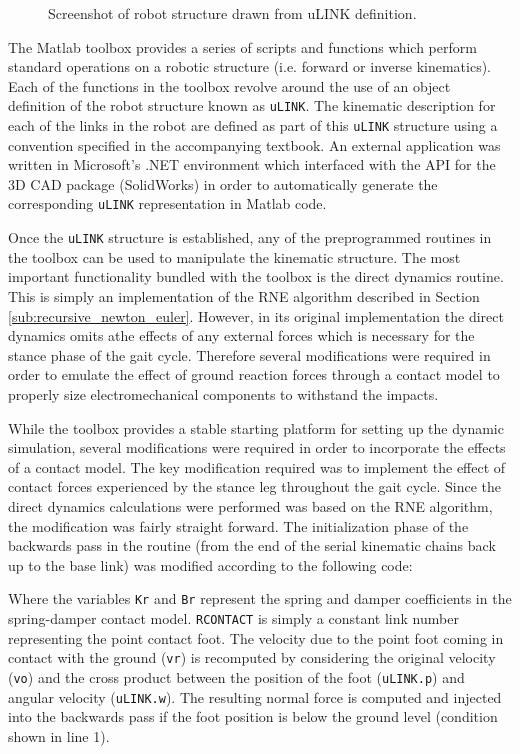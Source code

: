 \begin{figure}[!ht]
\begin{center}
	\end{center}
  \caption{Screenshot of robot structure drawn from uLINK definition.}
\end{figure}

The Matlab toolbox provides a series of scripts and functions which perform standard operations on a robotic structure (i.e. forward or inverse kinematics). Each of the functions in the toolbox revolve around the use of an object definition of the robot structure known as \texttt{uLINK}. The kinematic description for each of the links in the robot are defined as part of this \texttt{uLINK} structure using a convention specified in the accompanying textbook. An external application was written in Microsoft's .NET environment which interfaced with the API for the 3D CAD package (SolidWorks) in order to automatically generate the corresponding \texttt{uLINK} representation in Matlab code. 

Once the \texttt{uLINK} structure is established, any of the preprogrammed routines in the toolbox can be used to manipulate the kinematic structure. The most important functionality bundled with the toolbox is the direct dynamics routine. This is simply an implementation of the RNE algorithm described in Section \ref{sub:recursive_newton_euler}. However, in its original implementation the direct dynamics omits athe effects of any external forces which is necessary for the stance phase of the gait cycle. Therefore several modifications were required in order to emulate the effect of ground reaction forces through a contact model to properly size electromechanical components to withstand the impacts. 

While the toolbox provides a stable starting platform for setting up the dynamic simulation, several modifications were required in order to incorporate the effects of a contact model. The key modification required was to implement the effect of contact forces experienced by the stance leg throughout the gait cycle. Since the direct dynamics calculations were performed was based on the RNE algorithm, the modification was fairly straight forward. The initialization phase of the backwards pass in the routine (from the end of the serial kinematic chains back up to the base link) was modified according to the following code: 



Where the variables \texttt{Kr} and \texttt{Br} represent the spring and damper coefficients in the spring-damper contact model. \texttt{RCONTACT} is simply a constant link number representing the point contact foot. The velocity due to the point foot coming in contact with the ground (\texttt{vr}) is recomputed by considering the original velocity (\texttt{vo}) and the cross product between the position of the foot (\texttt{uLINK.p}) and angular velocity (\texttt{uLINK.w}). The resulting normal force is computed and injected into the backwards pass if the foot position is below the ground level (condition shown in line 1). 


